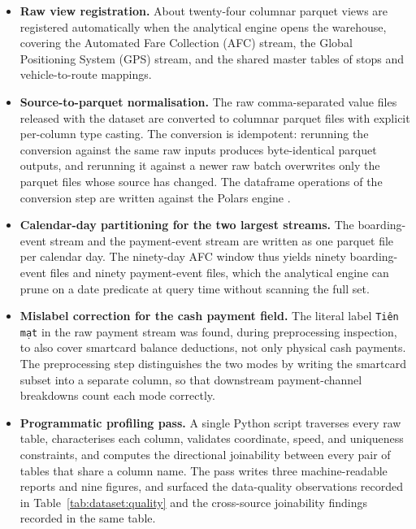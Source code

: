 \begin{itemize}
  \item \textbf{Raw view registration.} About twenty-four columnar
    parquet views are registered automatically when the analytical
    engine \cite{duckdb} opens the warehouse, covering the
    Automated Fare Collection (AFC) stream, the Global Positioning
    System (GPS) stream, and the shared master tables of stops and
    vehicle-to-route mappings.
  \item \textbf{Source-to-parquet normalisation.} The raw
    comma-separated value files released with the dataset are
    converted to columnar parquet files with explicit per-column type
    casting. The conversion is idempotent: rerunning the conversion
    against the same raw inputs produces byte-identical parquet
    outputs, and rerunning it against a newer raw batch overwrites
    only the parquet files whose source has changed. The dataframe
    operations of the conversion step are written against the Polars
    engine \cite{polars}.
  \item \textbf{Calendar-day partitioning for the two largest streams.}
    The boarding-event stream and the payment-event stream are written
    as one parquet file per calendar day. The ninety-day AFC window
    thus yields ninety boarding-event files and ninety payment-event
    files, which the analytical engine can prune on a date predicate
    at query time without scanning the full set.
  \item \textbf{Mislabel correction for the cash payment field.} The
    literal label \texttt{Ti\^en m\d{a}t} in the raw payment stream
    was found, during preprocessing inspection, to also cover
    smartcard balance deductions, not only physical cash payments.
    The preprocessing step distinguishes the two modes by writing the
    smartcard subset into a separate column, so that downstream
    payment-channel breakdowns count each mode correctly.
  \item \textbf{Programmatic profiling pass.} A single Python script
    traverses every raw table, characterises each column, validates
    coordinate, speed, and uniqueness constraints, and computes the
    directional joinability between every pair of tables that share a
    column name. The pass writes three machine-readable reports and
    nine figures, and surfaced the data-quality observations recorded
    in Table~\ref{tab:dataset:quality} and the cross-source joinability
    findings recorded in the same table.
\end{itemize}

